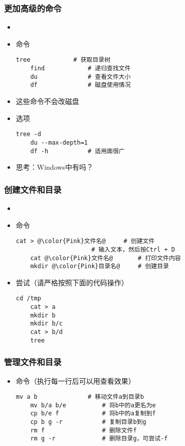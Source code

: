 \begin{CJK}{UTF8}{gbsn}
\begin{frame} [fragile]
	\frametitle{更加高级的命令}
	\begin{itemize}
	\item {}
	\item 命令
	\begin{lstlisting}[style=bashstyle, gobble=4, texcl]
	tree			# 获取目录树
	find			# 递归查找文件
	du				# 查看文件大小
	df				# 磁盘使用情况
	\end{lstlisting}
	\item 这些命令不会改磁盘
	\item 选项
	\begin{lstlisting}[style=bashstyle, gobble=4, texcl]
	tree -d
	du --max-depth=1
	df -h			# 适用面很广
	\end{lstlisting}
	\item 思考：Windows中有吗？
	\end{itemize}
\end{frame}

\begin{frame} [fragile]
	\frametitle{创建文件和目录}
	\begin{itemize}
	\item {}
	\item 命令
	\begin{lstlisting}[style=bashstyle, gobble=4, texcl, escapechar=@]
	cat > @\color{Pink}文件名@		# 创建文件
					 # 输入文本，然后按Ctrl + D
	cat @\color{Pink}文件名@		# 打印文件内容
	mkdir @\color{Pink}目录名@		# 创建目录
	\end{lstlisting}
	\item 尝试（请严格按照下面的代码操作）
	\begin{lstlisting}[style=bashstyle, gobble=4, texcl]
	cd /tmp
	cat > a
	mkdir b
	mkdir b/c
	cat > b/d
	tree
	\end{lstlisting}
	\end{itemize}
\end{frame}

\begin{frame} [fragile]
	\frametitle{管理文件和目录}
	\linespread{1.25}
	\begin{itemize}
	\item 命令（执行每一行后可以用查看效果）
	\begin{lstlisting}[style=bashstyle, gobble=4, texcl]
	mv a b				# 移动文件a到目录b
	mv b/a b/e			# 将b中的a更名为e
	cp b/e f			# 将b中的a复制到f
	cp b g -r			# 复制目录b到g
	rm f				# 删除文件f
	rm g -r				# 删除目录g，可尝试-f
	\end{lstlisting}
	\end{itemize}
\end{frame}


\end{CJK}
